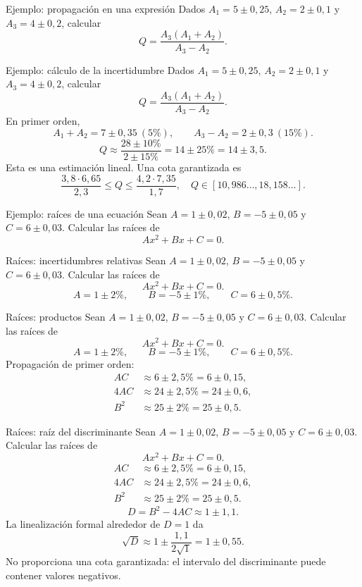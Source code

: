 \documentclass[original_version/main.tex]{subfiles}
\begin{document}
\begin{frame}{Ejemplo: propagación en una expresión}
Dados $A_1=5\pm0{,}25$, $A_2=2\pm0{,}1$ y $A_3=4\pm0{,}2$, calcular\[Q=\frac{A_3(A_1+A_2)}{A_3-A_2}.\]
\end{frame}

\begin{frame}{Ejemplo: cálculo de la incertidumbre}
\small Dados $A_1=5\pm0{,}25$, $A_2=2\pm0{,}1$ y $A_3=4\pm0{,}2$, calcular\[Q=\frac{A_3(A_1+A_2)}{A_3-A_2}.\]En primer orden,\[A_1+A_2=7\pm0{,}35\ (5\%),\qquad A_3-A_2=2\pm0{,}3\ (15\%).\]\[Q\approx\frac{28\pm10\%}{2\pm15\%}=14\pm25\%=14\pm3{,}5.\]Esta es una estimación lineal. Una cota garantizada es\[\frac{3{,}8\cdot6{,}65}{2{,}3}\le Q\le\frac{4{,}2\cdot7{,}35}{1{,}7},\quad Q\in[10{,}986\ldots,18{,}158\ldots].\]
\end{frame}

\begin{frame}{Ejemplo: raíces de una ecuación}
Sean $A=1\pm0{,}02$, $B=-5\pm0{,}05$ y $C=6\pm0{,}03$. Calcular las raíces de\[Ax^2+Bx+C=0.\]
\end{frame}

\begin{frame}{Raíces: incertidumbres relativas}
Sean $A=1\pm0{,}02$, $B=-5\pm0{,}05$ y $C=6\pm0{,}03$. Calcular las raíces de\[Ax^2+Bx+C=0.\]\[A=1\pm2\%,\qquad B=-5\pm1\%,\qquad C=6\pm0{,}5\%.\]
\end{frame}

\begin{frame}{Raíces: productos}
\small Sean $A=1\pm0{,}02$, $B=-5\pm0{,}05$ y $C=6\pm0{,}03$. Calcular las raíces de\[Ax^2+Bx+C=0.\]\[A=1\pm2\%,\qquad B=-5\pm1\%,\qquad C=6\pm0{,}5\%.\]Propagación de primer orden:\begin{align*}AC&\approx6\pm2{,}5\%=6\pm0{,}15,\\4AC&\approx24\pm2{,}5\%=24\pm0{,}6,\\B^2&\approx25\pm2\%=25\pm0{,}5.\end{align*}
\end{frame}

\begin{frame}{Raíces: raíz del discriminante}
\small Sean $A=1\pm0{,}02$, $B=-5\pm0{,}05$ y $C=6\pm0{,}03$. Calcular las raíces de\[Ax^2+Bx+C=0.\]\begin{align*}AC&\approx6\pm2{,}5\%=6\pm0{,}15,\\4AC&\approx24\pm2{,}5\%=24\pm0{,}6,\\B^2&\approx25\pm2\%=25\pm0{,}5.\end{align*}\[D=B^2-4AC\approx1\pm1{,}1.\]La linealización formal alrededor de $D=1$ da\[\sqrt D\approx1\pm\frac{1{,}1}{2\sqrt1}=1\pm0{,}55.\]No proporciona una cota garantizada: el intervalo del discriminante puede contener valores negativos.
\end{frame}
\end{document}
